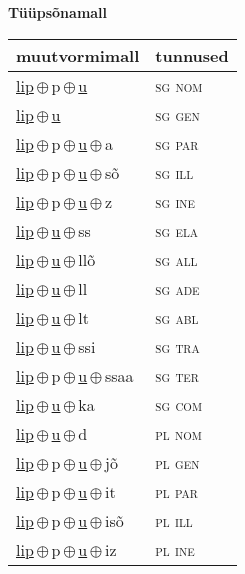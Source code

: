 

\vspace{3.5em}
\noindent \begin{minipage}{\textwidth}
\noindent \textbf{Tüüpsõnamall \,}\\

\begin{sideways}
\begin{tabular}{l l}
muutvormimall & tunnused \\
\hline
\underline{lip}\,$\oplus$\,p\,$\oplus$\,\underline{u} & \textsc{ sg nom } \\
\underline{lip}\,$\oplus$\,\underline{u} & \textsc{ sg gen } \\
\underline{lip}\,$\oplus$\,p\,$\oplus$\,\underline{u}\,$\oplus$\,a & \textsc{ sg par } \\
\underline{lip}\,$\oplus$\,p\,$\oplus$\,\underline{u}\,$\oplus$\,sõ & \textsc{ sg ill } \\
\underline{lip}\,$\oplus$\,p\,$\oplus$\,\underline{u}\,$\oplus$\,z & \textsc{ sg ine } \\
\underline{lip}\,$\oplus$\,\underline{u}\,$\oplus$\,ss & \textsc{ sg ela } \\
\underline{lip}\,$\oplus$\,\underline{u}\,$\oplus$\,llõ & \textsc{ sg all } \\
\underline{lip}\,$\oplus$\,\underline{u}\,$\oplus$\,ll & \textsc{ sg ade } \\
\underline{lip}\,$\oplus$\,\underline{u}\,$\oplus$\,lt & \textsc{ sg abl } \\
\underline{lip}\,$\oplus$\,\underline{u}\,$\oplus$\,ssi & \textsc{ sg tra } \\
\underline{lip}\,$\oplus$\,p\,$\oplus$\,\underline{u}\,$\oplus$\,ssaa & \textsc{ sg ter } \\
\underline{lip}\,$\oplus$\,\underline{u}\,$\oplus$\,ka & \textsc{ sg com } \\
\underline{lip}\,$\oplus$\,\underline{u}\,$\oplus$\,d & \textsc{ pl nom } \\
\underline{lip}\,$\oplus$\,p\,$\oplus$\,\underline{u}\,$\oplus$\,jõ & \textsc{ pl gen } \\
\underline{lip}\,$\oplus$\,p\,$\oplus$\,\underline{u}\,$\oplus$\,it & \textsc{ pl par } \\
\underline{lip}\,$\oplus$\,p\,$\oplus$\,\underline{u}\,$\oplus$\,isõ & \textsc{ pl ill } \\
\underline{lip}\,$\oplus$\,p\,$\oplus$\,\underline{u}\,$\oplus$\,iz & \textsc{ pl ine } \\

\end{tabular}
\end{sideways}
\end{minipage}
